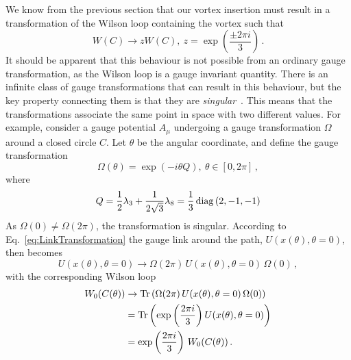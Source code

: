 We know from the previous section that our vortex insertion must result in a transformation of the Wilson loop containing the vortex such that
%
\begin{equation}
W(C)\rightarrow z W(C),~z = \exp\left(\frac{\pm2\pi i}{3}\right)\, .
\end{equation} 
%
It should be apparent that this behaviour is not possible from an ordinary gauge transformation, as the Wilson loop is a gauge invariant quantity. There is an infinite class of gauge transformations that can result in this behaviour, but the key property connecting them is that they are \textit{singular}~\cite{'tHooft:1977hy}. This means that the transformations associate the same point in space with two different values. For example, consider a gauge potential $A_\mu$ undergoing a gauge transformation $\Omega$ around a closed circle $C$. Let $\theta$ be the angular coordinate, and define the gauge transformation
%
\begin{equation}
\Omega(\theta) = \exp\left(-i\theta Q\right),~\theta\in [0,2\pi]\, ,
\label{eq:SingularGT}
\end{equation}
%
where
%
\begin{equation}
Q = \frac{1}{2}\lambda_3 +\frac{1}{2\sqrt{3}}\lambda_8 = \frac{1}{3}\operatorname{diag}\left(2,-1,-1\right)\label{eq:Q}
\end{equation}
As $\Omega(0) \neq \Omega(2\pi)$, the transformation is singular. According to Eq.~\ref{eq:LinkTransformation} the gauge link around the path, $U(x(\theta),\theta=0)$, then becomes
%
\begin{equation}
U(x(\theta),\theta=0) \rightarrow \Omega(2\pi)\,U(x(\theta),\theta=0)\,\Omega(0)\, ,
\end{equation}
%
with the corresponding Wilson loop
%
\begin{align}
W_0(C(\theta)) &\rightarrow \operatorname{Tr}\left( \Omega(2\pi)\,U(x(\theta),\theta=0)\,\Omega(0)\right)\\
&=\operatorname{Tr}\left(\exp\left(\frac{2\pi i}{3}\right)U(x(\theta),\theta=0)\right)\\
&=\exp\left(\frac{2\pi i}{3}\right)\,W_0(C(\theta))\, .
\end{align}
